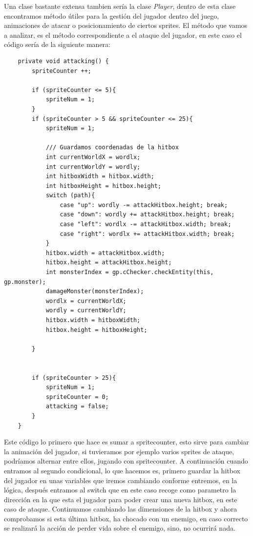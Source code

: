 \documentclass[a4paper]{article}
\begin{document}
Una clase bastante extensa tambien sería la clase \textit{Player}, dentro de esta clase encontramos método útiles para la gestión del jugador dentro del juego, animaciones de atacar o posicionamiento de ciertos sprites. El método que vamos a analizar, es el método correspondiente a 
el ataque del jugador, en este caso el código sería de la siguiente manera:
\begin{lstlisting}
    private void attacking() {
        spriteCounter ++;

        if (spriteCounter <= 5){
            spriteNum = 1;
        }
        if (spriteCounter > 5 && spriteCounter <= 25){
            spriteNum = 1;

            /// Guardamos coordenadas de la hitbox
            int currentWorldX = wordlx;
            int currentWorldY = wordly;
            int hitboxWidth = hitbox.width;
            int hitboxHeight = hitbox.height;
            switch (path){
                case "up": wordly -= attackHitbox.height; break;
                case "down": wordly += attackHitbox.height; break;
                case "left": wordlx -= attackHitbox.width; break;
                case "right": wordlx += attackHitbox.width; break;
            }
            hitbox.width = attackHitbox.width;
            hitbox.height = attackHitbox.height;
            int monsterIndex = gp.cChecker.checkEntity(this, gp.monster);
            damageMonster(monsterIndex);
            wordlx = currentWorldX;
            wordly = currentWorldY;
            hitbox.width = hitboxWidth;
            hitbox.height = hitboxHeight;

        }


        if (spriteCounter > 25){
            spriteNum = 1;
            spriteCounter = 0;
            attacking = false;
        }
    }
\end{lstlisting}
Este código lo primero que hace es sumar a spritecounter, esto sirve para cambiar la animación del jugador, si tuvieramos por ejemplo varios sprites de ataque, podríamos alternar entre ellos,
jugando con spritecounter. A continuación cuando entramos al segundo condicional, lo que hacemos es, primero guardar la hitbox del jugador en unas variables que iremos cambiando conforme entremos,
en la lógica, después entramos al switch que en este caso recoge como parametro la dirección en la que esta el jugador para poder crear una nueva hitbox, en este caso de ataque.
Continuamos cambiando las dimensiones de la hitbox y ahora comprobamos si esta última hitbox, ha chocado con un enemigo, en caso correcto se realizará la acción de perder vida sobre el enemigo, sino, no ocurrirá nada.
\end{document}
